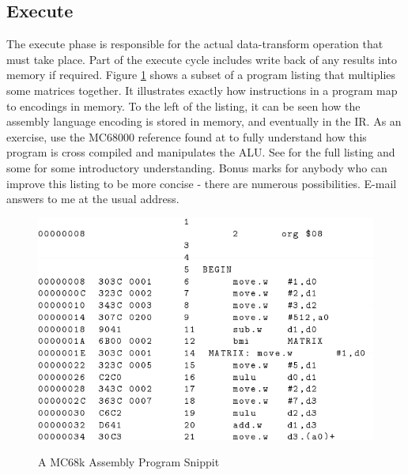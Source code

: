 \documentclass[10pt,a4paper]{article}
\begin{document}
\subsection{Execute}
The execute phase is responsible for the actual data-transform operation that must take place. Part of the execute cycle includes write back of any results into memory if required. 
\newline\newline
Figure \ref{program} shows a subset of a program listing that multiplies some matrices together. It illustrates exactly how instructions in a program map to encodings in memory. To the left of the listing, it can be seen how the assembly language encoding is stored in memory, and eventually in the IR. As an exercise, use the MC68000 reference found at \cite{68KREF} to fully understand how this program is cross compiled and manipulates the ALU. See \cite{LYNCH-68K} for the full listing and some for some introductory understanding. Bonus marks for anybody who can improve this listing to be more concise - there are numerous possibilities. E-mail answers to me at the usual address. 
\begin{figure}
\caption{A MC68k Assembly Program Snippit \cite{LYNCH-68K}}
\begin{center}
\includegraphics[scale=0.50]{../images/assembly-program.png}
\label{program}
\end{center}
\end{figure}
\end{document}
